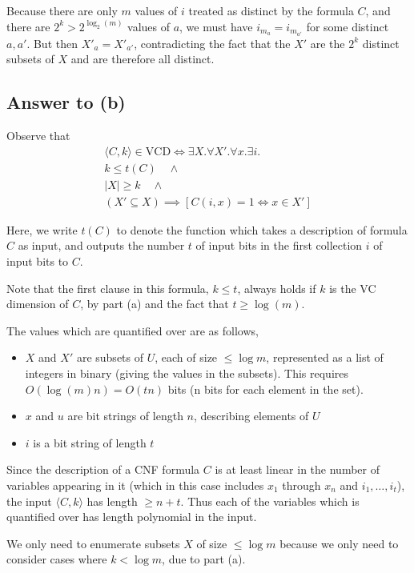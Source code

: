 \documentclass{article}
\begin{document}
Because there are only $m$ values of $i$ treated as distinct by the formula $C$, and there are $2^k > 2^{\log_2(m)}$ values of $a$, we must have $i_{m_a} = i_{m_{a'}}$ for some distinct $a, a'$.  But then $X'_a = X'_{a'}$, contradicting the fact that the $X'$ are the $2^k$ distinct subsets of $X$ and are therefore all distinct.

\subsection*{Answer to (b)}
Observe that
\begin{multline*}
\langle C, k \rangle \in \text{VCD} \iff
\exists X  .
\forall X' .
\forall x  .
\exists i  . \\
k \leq t(C) \quad \wedge \\
|X| \geq k \quad \wedge \\
(X' \subseteq X) \implies [C(i, x) = 1 \iff x \in X']
\end{multline*}

Here, we write $t(C)$ to denote the function which takes a description of formula $C$ as input, and outputs the number $t$ of input bits in the first collection $i$ of input bits to $C$.

Note that the first clause in this formula, $k \leq t$, always holds if $k$ is the VC dimension of $C$, by part (a) and the fact that $t \geq \log(m)$.

The values which are quantified over are as follows,
\begin{itemize}
	\item $X$ and $X'$ are subsets of $U$, each of size $\leq \log m$, represented as a list of integers in binary (giving the values in the subsets).  This requires $O(\log(m) n) = O(t n)$ bits (n bits for each element in the set).
	\item $x$ and $u$ are bit strings of length $n$, describing elements of $U$
	\item $i$ is a bit string of length $t$
\end{itemize}

Since the description of a CNF formula $C$ is at least linear in the number of variables appearing in it (which in this case includes $x_1$ through $x_n$ and $i_1, \dots, i_t$), the input $\langle C, k \rangle$ has length $\geq n + t$.  Thus each of the variables which is quantified over has length polynomial in the input.

We only need to enumerate subsets $X$ of size $\leq \log m$ because we only need to consider cases where $k < \log m$, due to part (a).
\end{document}
